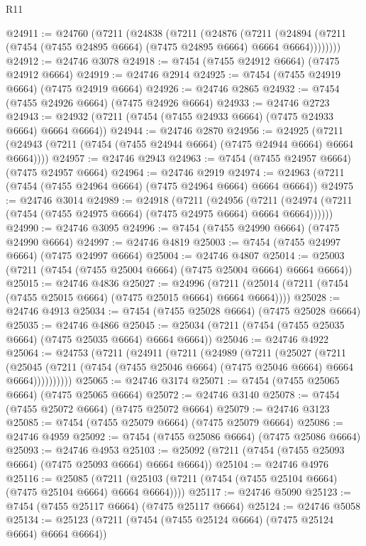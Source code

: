 \begin{lexlean}{R11}
\begin{coremodule}
{{{{{{{{{{{{{{{{{{{{{{{{{{{{{{{{{{{{{{{{{{{{{{{{{{{{{{{{{{{{{{{{{{{{{{{{{{{{{{{{{{@24911 := @24760
    (@7211
      (@24838
        (@7211
          (@24876
            (@7211
              (@24894 (@7211 (@7454 (@7455 @24895 @6664) (@7475 @24895 @6664) @6664 @6664))))))))
@24912 := @24746 @3078
@24918 := @7454 (@7455 @24912 @6664) (@7475 @24912 @6664)
@24919 := @24746 @2914
@24925 := @7454 (@7455 @24919 @6664) (@7475 @24919 @6664)
@24926 := @24746 @2865
@24932 := @7454 (@7455 @24926 @6664) (@7475 @24926 @6664)
@24933 := @24746 @2723
@24943 := @24932 (@7211 (@7454 (@7455 @24933 @6664) (@7475 @24933 @6664) @6664 @6664))
@24944 := @24746 @2870
@24956 := @24925
    (@7211 (@24943 (@7211 (@7454 (@7455 @24944 @6664) (@7475 @24944 @6664) @6664 @6664))))
@24957 := @24746 @2943
@24963 := @7454 (@7455 @24957 @6664) (@7475 @24957 @6664)
@24964 := @24746 @2919
@24974 := @24963 (@7211 (@7454 (@7455 @24964 @6664) (@7475 @24964 @6664) @6664 @6664))
@24975 := @24746 @3014
@24989 := @24918
    (@7211
      (@24956
        (@7211 (@24974 (@7211 (@7454 (@7455 @24975 @6664) (@7475 @24975 @6664) @6664 @6664))))))
@24990 := @24746 @3095
@24996 := @7454 (@7455 @24990 @6664) (@7475 @24990 @6664)
@24997 := @24746 @4819
@25003 := @7454 (@7455 @24997 @6664) (@7475 @24997 @6664)
@25004 := @24746 @4807
@25014 := @25003 (@7211 (@7454 (@7455 @25004 @6664) (@7475 @25004 @6664) @6664 @6664))
@25015 := @24746 @4836
@25027 := @24996
    (@7211 (@25014 (@7211 (@7454 (@7455 @25015 @6664) (@7475 @25015 @6664) @6664 @6664))))
@25028 := @24746 @4913
@25034 := @7454 (@7455 @25028 @6664) (@7475 @25028 @6664)
@25035 := @24746 @4866
@25045 := @25034 (@7211 (@7454 (@7455 @25035 @6664) (@7475 @25035 @6664) @6664 @6664))
@25046 := @24746 @4922
@25064 := @24753
    (@7211
      (@24911
        (@7211
          (@24989
            (@7211
              (@25027
                (@7211
                  (@25045
                    (@7211 (@7454 (@7455 @25046 @6664) (@7475 @25046 @6664) @6664 @6664))))))))))
@25065 := @24746 @3174
@25071 := @7454 (@7455 @25065 @6664) (@7475 @25065 @6664)
@25072 := @24746 @3140
@25078 := @7454 (@7455 @25072 @6664) (@7475 @25072 @6664)
@25079 := @24746 @3123
@25085 := @7454 (@7455 @25079 @6664) (@7475 @25079 @6664)
@25086 := @24746 @4959
@25092 := @7454 (@7455 @25086 @6664) (@7475 @25086 @6664)
@25093 := @24746 @4953
@25103 := @25092 (@7211 (@7454 (@7455 @25093 @6664) (@7475 @25093 @6664) @6664 @6664))
@25104 := @24746 @4976
@25116 := @25085
    (@7211 (@25103 (@7211 (@7454 (@7455 @25104 @6664) (@7475 @25104 @6664) @6664 @6664))))
@25117 := @24746 @5090
@25123 := @7454 (@7455 @25117 @6664) (@7475 @25117 @6664)
@25124 := @24746 @5058
@25134 := @25123 (@7211 (@7454 (@7455 @25124 @6664) (@7475 @25124 @6664) @6664 @6664))
}}}}}}}}}}}}}}}}}}}}}}}}}}}}}}}}}}}}}}}}}}}}}}}}}}}}}}}}}}}}}}}}}}}}}}}}}}}}}}}}}}
\end{coremodule}
\end{lexlean}
